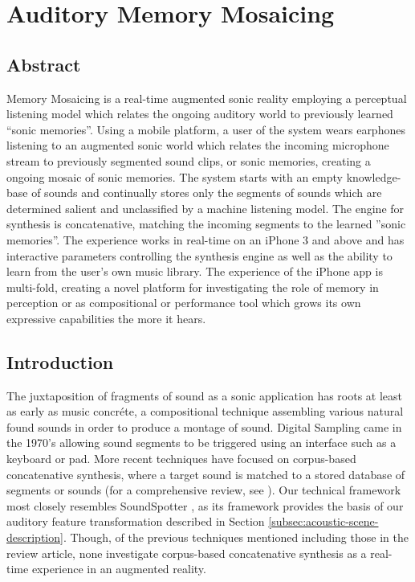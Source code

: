 
\chapter{Auditory Memory Mosaicing}

\minitoc

\section{Abstract}

Memory Mosaicing is a real-time augmented sonic reality employing a perceptual listening model which relates the ongoing auditory world to previously learned ``sonic memories''.  Using a mobile platform, a user of the system wears earphones listening to an augmented sonic world which relates the incoming microphone stream to previously segmented sound clips, or sonic memories, creating a ongoing mosaic of sonic memories.  The system starts with an empty knowledge-base of sounds and continually stores only the segments of sounds which are determined salient and unclassified by a machine listening model.  The engine for synthesis is concatenative, matching the incoming segments to the learned ''sonic memories''.  The experience works in real-time on an iPhone 3 and above and has interactive parameters controlling the synthesis engine as well as the ability to learn from the user's own music library.  The experience of the iPhone app is multi-fold, creating a novel platform for investigating the role of memory in perception or as compositional or performance tool which grows its own expressive capabilities the more it hears.

\section{Introduction}

The juxtaposition of fragments of sound as a sonic application has roots at least as early as music concréte, a compositional technique assembling various natural found sounds in order to produce a montage of sound.  Digital Sampling came in the 1970's allowing sound segments to be triggered using an interface such as a keyboard or pad.  More recent techniques have focused on corpus-based concatenative synthesis, where a target sound is matched to a stored database of segments or sounds (for a comprehensive review, see \cite{Schwarz2006}).  Our technical framework most closely resembles SoundSpotter \cite{CaseyICMC2007}, as its framework provides the basis of our auditory feature transformation described in Section \ref{subsec:acoustic-scene-description}.  Though, of the previous techniques mentioned including those in the review article, none investigate corpus-based concatenative synthesis as a real-time experience in an augmented reality.


